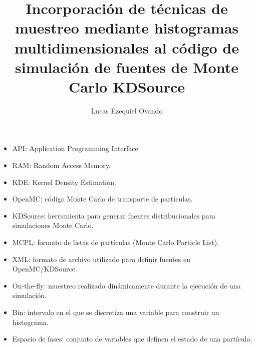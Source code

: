 \documentclass[12pt,screen,twoside,pagebackref]{ibtesis}
\title{Incorporación de técnicas de muestreo mediante histogramas multidimensionales al código de
simulación de fuentes de Monte Carlo KDSource}
\author{Lucas Ezequiel Ovando}
\begin{document}

\begin{preliminary}



\begin{abreviaturas}
\begin{itemize}
    \item API: Application Programming Interface
    \item RAM: Random Access Memory.
    \item KDE: Kernel Density Estimation.
    \item OpenMC: código Monte Carlo de transporte de partículas.
    \item KDSource: herramienta para generar fuentes distribucionales para simulaciones Monte Carlo.
    \item MCPL: formato de listas de partículas (Monte Carlo Particle List).
    \item XML: formato de archivo utilizado para definir fuentes en OpenMC/KDSource.
    \item On-the-fly: muestreo realizado dinámicamente durante la ejecución de una simulación.
    \item Bin: intervalo en el que se discretiza una variable para construir un histograma.
    \item Espacio de fases: conjunto de variables que definen el estado de una partícula.
\end{itemize}                            
\end{abreviaturas}

\tableofcontents                %

\listoffigures                  %

\listoftables                   %



\end{preliminary}




% 





\appendix

\end{document}

